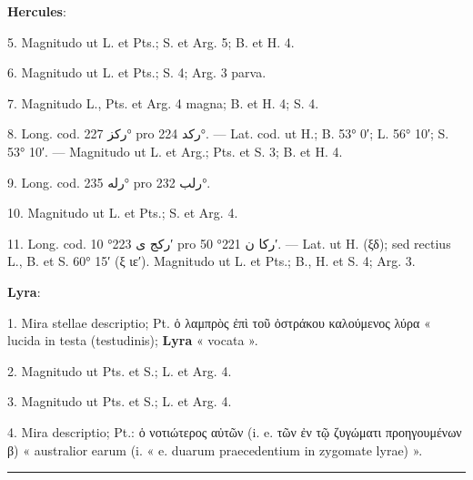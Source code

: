 \documentclass[11pt]{article}
\begin{document}
{\small
\par\hspace*{8mm}\textbf{Hercules}:
\par\hangindent=12mm 5. Magnitudo ut L. et Pts.; S. et Arg. 5; B. et H. 4.
\par\hangindent=12mm 6. Magnitudo ut L. et Pts.; S. 4; Arg. 3 parva.
\par\hangindent=12mm 7. Magnitudo L., Pts. et Arg. 4 magna; B. et H. 4; S. 4.
\par\hangindent=12mm 8. Long. cod. \textarabic{ركز} 227° pro \textarabic{ركد} 224°. — Lat. cod. ut H.; B. 53° 0′; L. 56° 10′; S. 53° 10′. — Magnitudo ut L. et Arg.; Pts. et S. 3; B. et H. 4.
\par\hangindent=12mm 9. Long. cod. \textarabic{رله} 235° pro \textarabic{رلب} 232°.
\par\hangindent=12mm 10. Magnitudo ut L. et Pts.; S. et Arg. 4.
\par\hangindent=12mm 11. Long. cod. \textarabic{ركج ى} 223° 10′ pro \textarabic{ركا ن} 221° 50′. — Lat. ut H. (ξδ); sed rectius L., B. et S. 60° 15′ (ξ ιε′). Magnitudo ut L. et Pts.; B., H. et S. 4; Arg. 3.
\par\hspace*{8mm}\textbf{Lyra}:
\par\hangindent=12mm 1. Mira stellae descriptio; Pt. ὁ λαμπρὸς ἐπὶ τοῦ ὀστράκου καλούμενος λύρα « lucida in testa (testudinis); \textbf{Lyra} « vocata ».
\par\hangindent=12mm 2. Magnitudo ut Pts. et S.; L. et Arg. 4.
\par\hangindent=12mm 3. Magnitudo ut Pts. et S.; L. et Arg. 4.
\par\hangindent=12mm 4. Mira descriptio; Pt.: ὁ νοτιώτερος αὐτῶν (i. e. τῶν ἐν τῷ ζυγώματι προηγουμένων β) « australior earum (i. « e. duarum praecedentium in zygomate lyrae) ».
\par}
\clearpage
\noindent{}\par\vspace{-1mm}\noindent\rule{\textwidth}{.4pt}\par\vspace{2mm}
\end{document}
